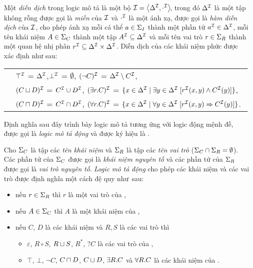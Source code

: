 \begin{Definition}
Một {\em diễn dịch} trong logic mô tả \ALC là một bộ \mbox{$\mathcal{I} = \left\langle\Delta^{\mathcal{I}}, \cdot^{\mathcal{I}}\right\rangle\!$}, trong đó $\Delta^{\mathcal{I}}$ là một tập không rỗng được gọi là {\em miền} của $\mathcal{I}$ và $\cdot^{\mathcal{I}}$ là một ánh xạ, được gọi là {\em hàm diễn dịch} của $\mathcal{I}$, cho phép ánh xạ mỗi cá thể $a \in \Sigma_I$ thành một phần tử $a^{\mathcal{I}} \in \Delta^{\mathcal{I}}$, mỗi tên khái niệm $A \in \Sigma_C$ thành một tập $A^{\mathcal{I}} \subseteq \Delta^{\mathcal{I}}$ và mỗi tên vai trò $r \in \Sigma_R$ thành một quan hệ nhị phân $r^{\mathcal{I}} \subseteq \Delta^{\mathcal{I}} \times \Delta^{\mathcal{I}}$.
Diễn dịch của các khái niệm phức được xác định như sau:\\[1.5ex]
\begin{tabular}{c l}
	& $\top^{\mathcal{I}}$ = $\Delta^{\mathcal{I}}$, \qquad\qquad\qquad\qquad $\!\!\bot^{\mathcal{I}}$ = $\emptyset$, \qquad\qquad\qquad\qquad $(\neg C)^{\mathcal{I}}$ = $\Delta^{\mathcal{I}} \setminus C^{\mathcal{I}}$, \\[0.5ex]
	& $(C \sqcup D)^{\mathcal{I}}$ = $C^{\mathcal{I}} \cup D^{\mathcal{I}}$, \quad $(\exists r.C)^{\mathcal{I}}$ = $\{x \in \Delta^{\mathcal{I}} \mid \exists y\in \Delta^{\mathcal{I}}\; [r^{\mathcal{I}}(x,y) \wedge C^{\mathcal{I}}(y)]\}$, \\[0.7ex]
	& $(C \sqcap D)^{\mathcal{I}}$ = $C^{\mathcal{I}} \cap D^{\mathcal{I}}$, \quad $(\forall r.C)^{\mathcal{I}}$ = $\{ x \in \Delta^{\mathcal{I}} \mid \forall y \in \Delta^{\mathcal{I}}\; [r^{\mathcal{I}}(x,y) \Rightarrow C^{\mathcal{I}}(y)]\}$.\;\,\,\myend
\end{tabular}
\end{Definition}

Định nghĩa sau đây trình bày logic mô tả \ALC tương ứng với logic động mệnh đề, được gọi là {\em logic mô tả động} và được ký hiệu là \ALCreg.
\begin{Definition}
\label{def:ALCRegSyntax}
Cho $\Sigma_C$ là tập các {\em tên khái niệm} và $\Sigma_R$ là tập các {\em tên vai trò} ($\Sigma_C \cap \Sigma_R = \emptyset$). Các phần tử của $\Sigma_C$ được gọi là {\em khái niệm nguyên tố} và các phần tử của $\Sigma_R$ được gọi là {\em vai trò nguyên tố}. {\em Logic mô tả động} \ALCreg cho phép các khái niệm và các vai trò được định nghĩa một cách đệ quy như~sau:
\begin{itemize}
	\item nếu $r \in \Sigma_R$ thì $r$ là một vai trò của \ALCreg,
	\item nếu $A \in \Sigma_C$ thì $A$ là một khái niệm của \ALCreg,
	\item nếu $C$, $D$ là các khái niệm và $R, S$ là các vai trò thì 
	\begin{itemize}
		\item $\varepsilon$, $R \circ S$, $R \sqcup S$, $R^*$, $?C$ là các vai trò của \ALCreg,
		\item $\top$, $\bot$, $\neg C$, $C \sqcap D$, $C \sqcup D$, $\exists R.C$ và $\forall R.C$ là các khái niệm của \ALCreg.\myend
	\end{itemize}
\end{itemize}
\end{Definition}

